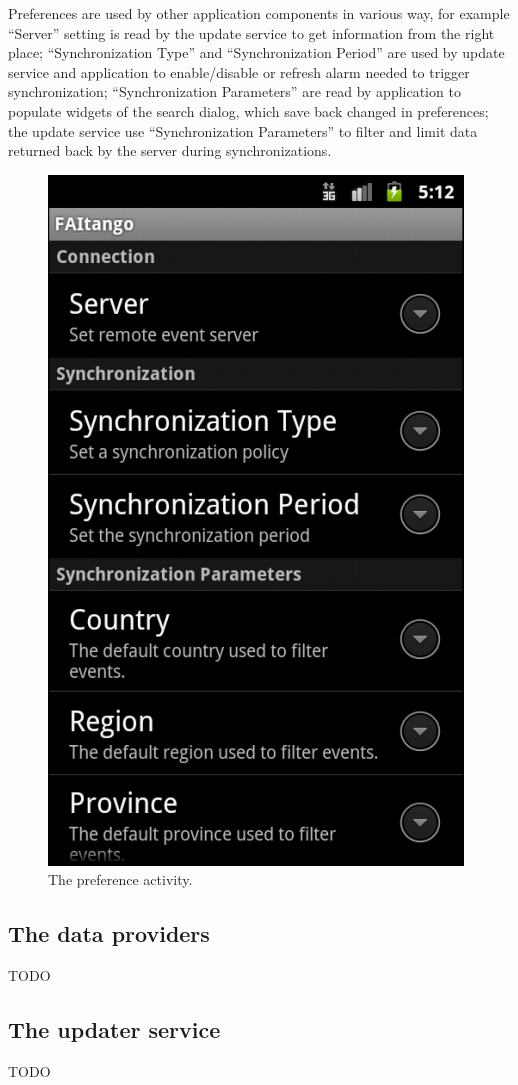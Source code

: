 \documentclass[12pt, twoside]{article}
\begin{document}
Preferences are used by other application components in various way, for example ``Server'' setting is read by the update service to get information from the right place; ``Synchronization Type'' and ``Synchronization Period'' are used by update service and application to enable/disable or refresh alarm needed to trigger synchronization; ``Synchronization Parameters'' are read by application to populate widgets of the search dialog, which save back changed in preferences; the update service use ``Synchronization Parameters'' to filter and limit data returned back by the server during synchronizations.

\begin{figure}[h]
\begin{center}
\includegraphics[scale=0.60]{fig/preference.png}
\end{center}
\caption{The preference activity.}
\label{fig:preference}
\end{figure}

\subsection{The data providers}
TODO

\subsection{The updater service}

TODO
\end{document}
